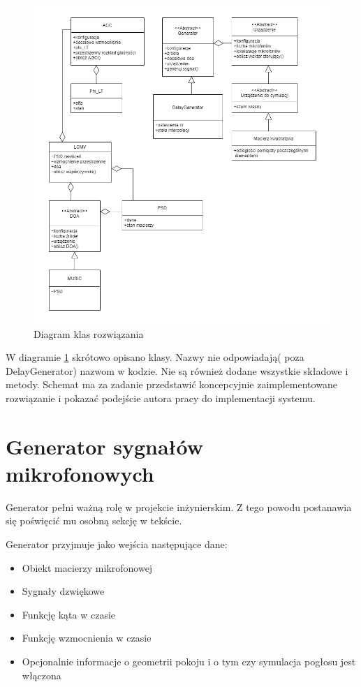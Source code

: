 \begin{figure}[h!]
    \centering
    \includegraphics[width=\textwidth]{Images/uml_pl.png}
    \caption{Diagram klas rozwiązania}
    \label{fig:classes}
\end{figure}


\noindent W diagramie \ref{fig:classes} skrótowo opisano klasy. Nazwy nie odpowiadają( poza DelayGenerator) nazwom w kodzie. Nie są również dodane wszystkie składowe i metody. Schemat ma za zadanie przedstawić koncepcyjnie zaimplementowane rozwiązanie i pokazać podejście autora pracy do implementacji systemu.


\newpage

\section{Generator sygnałów mikrofonowych}

Generator pełni ważną rolę w projekcie inżynierskim. Z tego powodu postanawia się poświęcić mu osobną sekcję w tekście. 

\noindent Generator przyjmuje jako wejścia następujące dane:

\begin{itemize}
    \item Obiekt macierzy mikrofonowej
    \item Sygnały dzwiękowe 
    \item Funkcję kąta w czasie
    \item Funkcję wzmocnienia w czasie
    \item Opcjonalnie informacje o geometrii pokoju i o tym czy symulacja pogłosu jest włączona
\end{itemize}

